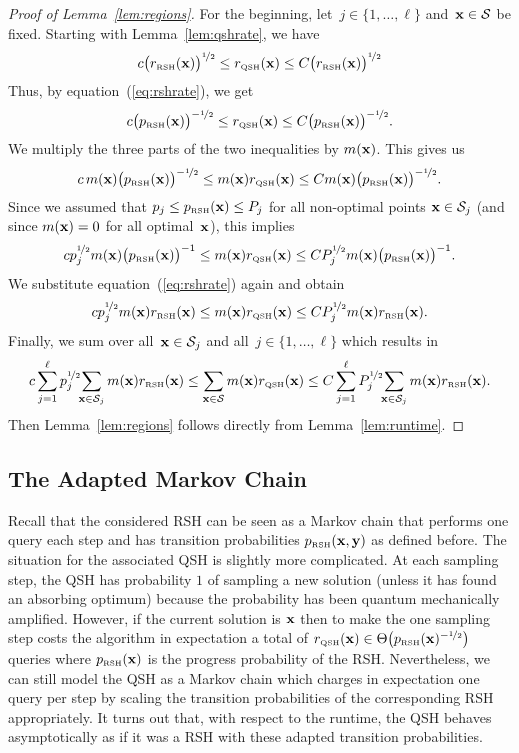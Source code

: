 \documentclass[a4paper,11pt]{article}
\begin{document}
\begin{proof}[Proof of Lemma~\ref{lem:regions}]
For the beginning, let~$j\in\{1,\dots,\ell\}$ and~$\xvec\in\mathcal{S}$ be fixed. Starting with Lemma~\ref{lem:qshrate}, we have
\[
\lb \big(r_\RSH(\xvec)\big)^{\nicefrac{1}{2}} \le r_\QSH(\xvec)\le \ub \big(r_\RSH(\xvec)\big)^{\nicefrac{1}{2}}
\]
Thus, by equation~(\ref{eq:rshrate}), we get
\[
\lb \big(p_\RSH(\xvec)\big)^{-\nicefrac{1}{2}} \le r_\QSH(\xvec)\le \ub \big(p_\RSH(\xvec)\big)^{-\nicefrac{1}{2}}.
\]
We multiply the three parts of the two inequalities by $m(\xvec)$. This gives us
\[
\lb \, m(\xvec) \big(p_\RSH(\xvec)\big)^{-\nicefrac{1}{2}} \le m(\xvec) r_\QSH(\xvec)\le \ub m(\xvec) \big(p_\RSH(\xvec)\big)^{-\nicefrac{1}{2}}.
\]
Since we assumed that $p_j\le p_\RSH(\xvec)\le P_j$ for all non-optimal points $\xvec\in\mathcal{S}_j$ (and since $m(\xvec)=0$ for all optimal~$\xvec$), this implies
\[
\lb p_j^{\nicefrac{1}{2}} m(\xvec) \big(p_\RSH(\xvec)\big)^{-1} \le m(\xvec) r_\QSH(\xvec)\le \ub P_j^{\nicefrac{1}{2}}m(\xvec) \big(p_\RSH(\xvec)\big)^{-1}.
\]
We substitute equation~(\ref{eq:rshrate}) again and obtain
\[
\lb p_j^{\nicefrac{1}{2}} m(\xvec) r_\RSH(\xvec) \le m(\xvec) r_\QSH(\xvec)\le \ub P_j^{\nicefrac{1}{2}} m(\xvec) r_\RSH(\xvec).
\]
Finally, we sum over all~$\xvec\in\mathcal{S}_j$ and all~$j\in\{1,\dots,\ell\}$ which results in
\[
\lb \sum_{j=1}^\ell p_j^{\nicefrac{1}{2}}\!\! \sum_{\xvec\in\mathcal{S}_j} m(\xvec) r_\RSH(\xvec) \le\sum_{\xvec\in\mathcal{S}} m(\xvec) r_\QSH(\xvec)\le \ub\sum_{j=1}^\ell P_j^{\nicefrac{1}{2}}\!\!\sum_{\xvec\in\mathcal{S}_j} m(\xvec) r_\RSH(\xvec).
\]
Then Lemma~\ref{lem:regions} follows directly from Lemma~\ref{lem:runtime}.
\end{proof}

\subsection{The Adapted Markov Chain}\label{subsec:markovchains}
Recall that the considered RSH can be seen as a Markov chain that performs one query each step and has transition probabilities $p_\RSH(\xvec,\yvec)$ as defined before. The situation for the associated QSH is slightly more complicated. At each sampling step, the QSH has probability $1$ of sampling a new solution (unless it has found an absorbing optimum) because the probability has been quantum mechanically amplified. However, if the current solution is $\xvec$ then to make the one sampling step costs the algorithm in expectation a total of $r_\QSH(\xvec)\in\Theta\big(p_\RSH(\xvec)^{-\nicefrac{1}{2}}\big)$ queries where $p_\RSH(\xvec)$ is the progress probability of the RSH. Nevertheless, we can still model the QSH as a Markov chain which charges in expectation one query per step by scaling the transition probabilities of the corresponding RSH appropriately. It turns out that, with respect to the runtime, the QSH behaves asymptotically as if it was a RSH with these adapted transition probabilities.
\end{document}
